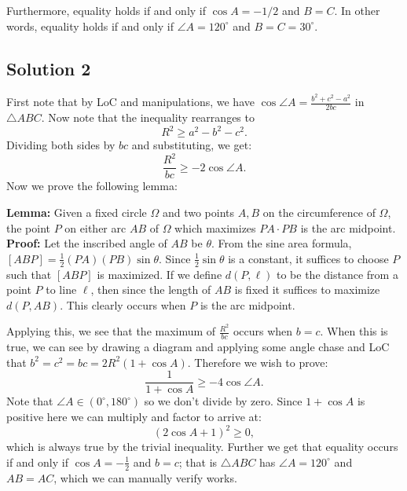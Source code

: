 \documentclass{article}
\begin{document}
Furthermore, equality holds if and only if $\cos A = -1/2$ and $B = C$. In other words, equality holds if and only if $\angle A = 120^\circ$ and $B = C = 30^\circ$.

\subsection{Solution 2}
First note that by LoC and manipulations, we have $\cos \angle A=\frac{b^2+c^2-a^2}{2bc}$ in $\triangle ABC$. Now note that the inequality rearranges to
$$R^2 \geq a^2-b^2-c^2.$$
Dividing both sides by $bc$ and substituting, we get:
$$\frac{R^2}{bc} \geq -2\cos \angle A.$$
Now we prove the following lemma:

\noindent\textbf{Lemma:} Given a fixed circle $\Omega$ and two points $A,B$ on the circumference of $\Omega$, the point $P$ on either arc $AB$ of $\Omega$ which maximizes $PA \cdot PB$ is the arc midpoint.\\
\textbf{Proof:} Let the inscribed angle of $AB$ be $\theta$. From the sine area formula, $[ABP]=\frac{1}{2}(PA)(PB)\sin \theta$. Since $\frac{1}{2}\sin \theta$ is a constant, it suffices to choose $P$ such that $[ABP]$ is maximized. If we define $d(P,\ell)$ to be the distance from a point $P$ to line $\ell$, then since the length of $AB$ is fixed it suffices to maximize $d(P,AB)$. This clearly occurs when $P$ is the arc midpoint.

Applying this, we see that the maximum of $\frac{R^2}{bc}$ occurs when $b=c$. When this is true, we can see by drawing a diagram and applying some angle chase and LoC that $b^2=c^2=bc=2R^2(1+\cos A)$. Therefore we wish to prove:
$$\frac{1}{1+\cos A} \geq -4\cos \angle A.$$
Note that $\angle A \in (0^\circ,180^\circ)$ so we don't divide by zero. Since $1+\cos A$ is positive here we can multiply and factor to arrive at:
$$(2\cos A+1)^2 \geq 0,$$
which is always true by the trivial inequality. Further we get that equality occurs if and only if $\cos A=-\frac{1}{2}$ and $b=c$; that is $\triangle ABC$ has $\angle A=120^\circ$ and $AB=AC$, which we can manually verify works.
\end{document}
